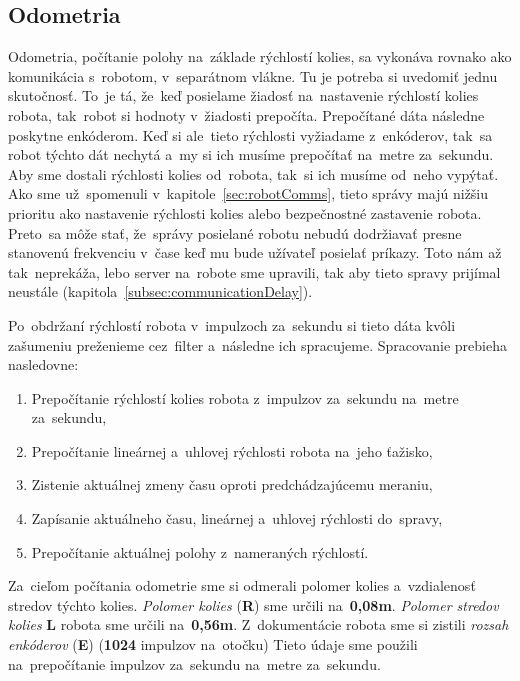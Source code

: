 \subsection{Odometria}
\label{sec:odometria}

Odometria, počítanie polohy na~základe rýchlostí kolies, sa vykonáva rovnako ako komunikácia
s~robotom, v~separátnom vlákne. Tu je potreba si uvedomiť jednu skutočnosť. To~je tá, že~keď
posielame žiadosť na~nastavenie rýchlostí kolies robota, tak~robot si hodnoty v~žiadosti prepočíta.
Prepočítané dáta následne poskytne enkóderom. Keď si ale~tieto rýchlosti vyžiadame z~enkóderov,
tak~sa robot týchto dát nechytá a~my si ich musíme prepočítať na~metre za~sekundu. Aby sme dostali
rýchlosti kolies od~robota, tak~si ich musíme od~neho vypýtať. Ako sme už~spomenuli v~kapitole~\ref{sec:robotComms},
tieto správy majú nižšiu prioritu ako nastavenie rýchlosti kolies alebo bezpečnostné zastavenie
robota. Preto~sa môže stať, že~správy posielané robotu nebudú dodržiavať presne stanovenú frekvenciu
v~čase keď mu bude užívateľ posielať príkazy. Toto nám až tak~neprekáža, lebo server na~robote sme upravili, tak aby tieto
spravy prijímal neustále (kapitola~\ref{subsec:communicationDelay}).

Po~obdržaní rýchlostí robota v~impulzoch za~sekundu si tieto dáta kvôli zašumeniu preženieme cez~filter
a~následne ich spracujeme. Spracovanie prebieha nasledovne:

\begin{enumerate}
	\item Prepočítanie rýchlostí kolies robota z~impulzov za~sekundu na~metre za~sekundu,
	\item Prepočítanie lineárnej a~uhlovej rýchlosti robota na~jeho ťažisko,
	\item Zistenie aktuálnej zmeny času oproti predchádzajúcemu meraniu,
	\item Zapísanie aktuálneho času, lineárnej a~uhlovej rýchlosti do~spravy,
	\item Prepočítanie aktuálnej polohy z~nameraných rýchlostí.
\end{enumerate}

Za~cieľom počítania odometrie sme si odmerali polomer kolies a~vzdialenosť stredov týchto kolies.
\textit{Polomer kolies} (\textbf{R}) sme určili na~\textbf{0,08m}. \textit{Polomer stredov kolies}
\textbf{L} robota sme určili na~\textbf{0,56m}. Z~dokumentácie robota \cite{encoder} sme si zistili
\textit{rozsah enkóderov} (\textbf{E}) (\textbf{1024} impulzov na~otočku)  Tieto údaje sme použili
na~prepočítanie impulzov za~sekundu na~metre za~sekundu.

